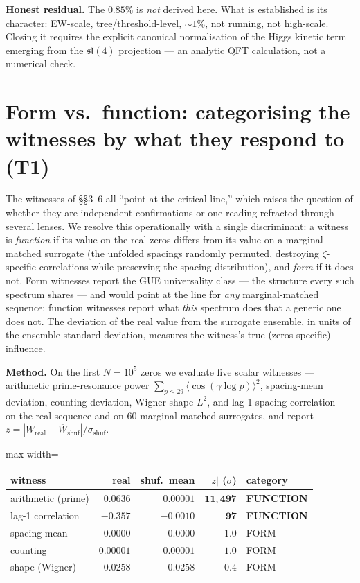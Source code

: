 \documentclass[11pt]{article}
\begin{document}
\textbf{Honest residual.} The $0.85\%$ is \emph{not} derived here. What is established is its character: EW-scale, tree/threshold-level, $\sim1\%$, not running, not high-scale. Closing it requires the explicit canonical normalisation of the Higgs kinetic term emerging from the $\mathfrak{sl}(4)$ projection --- an analytic QFT calculation, not a numerical check.

\section{Form vs.\ function: categorising the witnesses by what they respond to (T1)}

The witnesses of \S\S3--6 all ``point at the critical line,'' which raises the question of whether they are independent confirmations or one reading refracted through several lenses. We resolve this operationally with a single discriminant: a witness is \emph{function} if its value on the real zeros differs from its value on a marginal-matched surrogate (the unfolded spacings randomly permuted, destroying $\zeta$-specific correlations while preserving the spacing distribution), and \emph{form} if it does not. Form witnesses report the GUE universality class --- the structure every such spectrum shares --- and would point at the line for \emph{any} marginal-matched sequence; function witnesses report what \emph{this} spectrum does that a generic one does not. The deviation of the real value from the surrogate ensemble, in units of the ensemble standard deviation, measures the witness's true (zeros-specific) influence.

\textbf{Method.} On the first $N=10^5$ zeros we evaluate five scalar witnesses --- arithmetic prime-resonance power $\sum_{p\le29}\langle\cos(\gamma\log p)\rangle^2$, spacing-mean deviation, counting deviation, Wigner-shape $L^2$, and lag-1 spacing correlation --- on the real sequence and on $60$ marginal-matched surrogates, and report $z=|W_{\mathrm{real}}-\overline{W}_{\mathrm{shuf}}|/\sigma_{\mathrm{shuf}}$.

\begin{center}\small
\begin{adjustbox}{max width=\linewidth}\begin{tabular}{lrrrl}
\hline
witness & real & shuf.\ mean & $|z|$ ($\sigma$) & category \\
\hline
arithmetic (prime) & $0.0636$ & $0.00001$ & $\mathbf{11{,}497}$ & \textbf{FUNCTION} \\
lag-1 correlation & $-0.357$ & $-0.0010$ & $\mathbf{97}$ & \textbf{FUNCTION} \\
spacing mean & $0.0000$ & $0.0000$ & $1.0$ & FORM \\
counting & $0.00001$ & $0.00001$ & $1.0$ & FORM \\
shape (Wigner) & $0.0258$ & $0.0258$ & $0.4$ & FORM \\
\hline
\end{tabular}\end{adjustbox}
\end{center}
\end{document}
